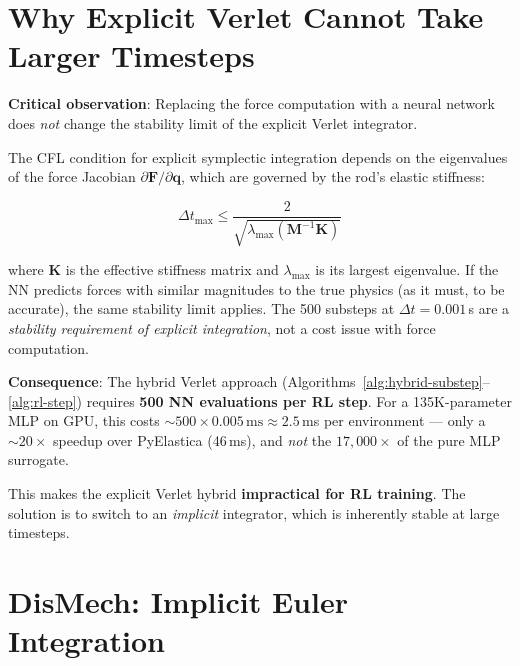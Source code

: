\documentclass[11pt]{article}
\newcommand{\vect}[1]{\mathbf{#1}}
\newcommand{\mat}[1]{\mathbf{#1}}
\begin{document}
\section{Why Explicit Verlet Cannot Take Larger Timesteps}
\label{sec:no-larger-dt}

\textbf{Critical observation}: Replacing the force computation with a neural network does \emph{not} change the stability limit of the explicit Verlet integrator.

The CFL condition for explicit symplectic integration depends on the eigenvalues of the force Jacobian $\partial \vect{F}/\partial \vect{q}$, which are governed by the rod's elastic stiffness:

\begin{equation}
  \Delta t_{\max} \leq \frac{2}{\sqrt{\lambda_{\max}(\mat{M}^{-1}\mat{K})}}
  \label{eq:cfl}
\end{equation}

\noindent
where $\mat{K}$ is the effective stiffness matrix and $\lambda_{\max}$ is its largest eigenvalue.
If the NN predicts forces with similar magnitudes to the true physics (as it must, to be accurate), the same stability limit applies.
The 500 substeps at $\Delta t = 0.001$\,s are a \emph{stability requirement of explicit integration}, not a cost issue with force computation.

\textbf{Consequence}: The hybrid Verlet approach (Algorithms~\ref{alg:hybrid-substep}--\ref{alg:rl-step}) requires \textbf{500 NN evaluations per RL step}.
For a 135K-parameter MLP on GPU, this costs ${\sim}500 \times 0.005\,\text{ms} \approx 2.5$\,ms per environment --- only a ${\sim}20\times$ speedup over PyElastica (46\,ms), and \emph{not} the $17{,}000\times$ of the pure MLP surrogate.

This makes the explicit Verlet hybrid \textbf{impractical for RL training}.
The solution is to switch to an \emph{implicit} integrator, which is inherently stable at large timesteps.


\section{DisMech: Implicit Euler Integration}
\label{sec:dismech}
\end{document}
